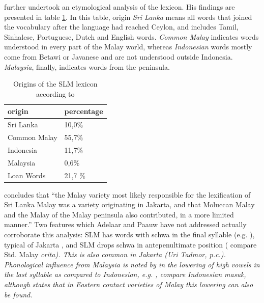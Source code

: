 \citet{Paauw2004} further undertook an etymological analysis of the lexicon.
His findings are presented in table
\ref{tab:originsOfTheSLMLexicon}. In this table, origin \textit{Sri Lanka} means all words that joined the vocabulary after the language had reached Ceylon, and includes Tamil, Sinhalese, Portuguese, Dutch and English words. \textit{Common Malay} indicates words understood in every part of the Malay world, whereas \textit{Indonesian} words mostly come from Betawi or Javanese and are not understood outside Indonesia. \textit{Malaysia}, finally, indicates words from the peninsula.

\begin{table}
    \centering
        \begin{tabular}{l|l}
                        origin      & percentage\\
                        \hline
                        Sri Lanka &       10,0\% \\
                        Common Malay &    55,7\% \\
                        Indonesia &       11,7\% \\
                        Malaysia &        0,6\% \\
                        Loan Words &      21,7 \% \\
        \end{tabular}
    \caption{Origins of the SLM lexicon according to \citet{Paauw2004}}
    \label{tab:originsOfTheSLMLexicon}
\end{table}

\citet{Paauw2004} concludes that ``the Malay variety most likely responsible for the lexification of Sri Lanka Malay was a variety originating in Jakarta, and that Moluccan Malay and the Malay of the Malay peninsula also contributed, in a more limited manner.''
Two features which Adelaar and Paauw have not addressed actually corroborate this analysis: SLM has words with schwa in the final syllable (e.g. ), typical of Jakarta \citep{Adelaar1985}, and SLM drops schwa in antepenultimate position ( compare Std. Malay \em c\E rita\em). This is also common in Jakarta (Uri Tadmor, p.c.). Phonological influence from Malaysia is noted by \citet{Paauw2004} in the lowering of high vowels in the last syllable as compared to Indonesian, e.g. , compare Indonesian \em masuk\em, although \citet[99]{Paauw2008phd} states that in Eastern contact varieties of Malay this lowering can also be found.

